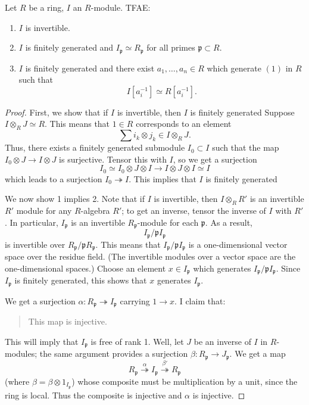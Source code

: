 \begin{proposition} 
Let $R$ be a ring, $I$ an $R$-module. TFAE:
\begin{enumerate}
\item $I$ is invertible.   
\item $I$ is finitely generated and $I_{\mathfrak{p}} \simeq R_{\mathfrak{p}}$ for all primes
$\mathfrak{p} \subset R$.
\item $I$ is finitely generated and there exist $a_1, \dots, a_n \in R$ which generate $(1)$
in $R$ such that
\[ I[a_i^{-1}]\simeq R[a_i^{-1}].  \]
\end{enumerate}
\end{proposition} 
\begin{proof} 
First, we show that if $I$ is invertible, then $I$ is finitely generated 
Suppose $I \otimes_R J \simeq R$. This means that $1 \in R$ corresponds to an
element
\[ \sum i_k \otimes j_k \in I \otimes_R J .  \]
Thus, there exists a finitely generated submodule $I_0\subset I$ such that the map $I_0 \otimes J \to I
\otimes J$ is surjective. Tensor this with $I$, so we get a surjection
\[ I_0 \simeq I_0 \otimes J \otimes I \to I \otimes J \otimes I \simeq I  \]
which leads to a surjection $I_0 \twoheadrightarrow I$. This implies that $I$
is finitely generated 


We now show 1 implies 2. Note that if $I$ is invertible, then $I \otimes_R R'$
is an invertible $R'$ module for any $R$-algebra $R'$; to get an inverse,
tensor the inverse of $I$ with $R'$.
In particular, $I_{\mathfrak{p}}$ is an invertible $R_{\mathfrak{p}}$-module
for each $\mathfrak{p}$. As a result, 
\[ I_{\mathfrak{p}}/\mathfrak{p} I_{\mathfrak{p}}  \]
is invertible over $R_{\mathfrak{p}}/\mathfrak{p}R_{\mathfrak{p}}$. This means
that 
$ I_{\mathfrak{p}}/\mathfrak{p} I_{\mathfrak{p}}$ is a one-dimensional vector
space over the residue field. (The invertible modules over a vector space are
the one-dimensional spaces.)
Choose an element $x \in I_{\mathfrak{p}}$ which generates
$I_{\mathfrak{p}}/\mathfrak{p}I_{\mathfrak{p}}$.  Since $I_{\mathfrak{p}}$ is
finitely generated, this shows that $x$ generates $I_{\mathfrak{p}}$.

We get a surjection $\alpha: R_{\mathfrak{p}} \twoheadrightarrow I_{\mathfrak{p}}$
carrying $1 \to x$.  I claim that:
\begin{quote}
This map is injective.
\end{quote}
This will imply that $I_{\mathfrak{p}}$ is free of rank 1. Well, let $J$ be an
inverse of $I$ in $R$-modules; the same argument provides a surjection
$ \beta: {R}_{\mathfrak{p}} \to J_{\mathfrak{p}}$. We get a map
\[ R_{\mathfrak{p}} \stackrel{\alpha}{\twoheadrightarrow} I_{\mathfrak{p}}
\stackrel{\beta'}{\twoheadrightarrow} R_{\mathfrak{p}}  \]
(where $\beta = \beta \otimes 1_{I_{\mathfrak{p}}}$)
whose composite must be multiplication by a unit, since the ring is local. Thus
the composite is injective and $\alpha$ is injective. 


\end{proof}
